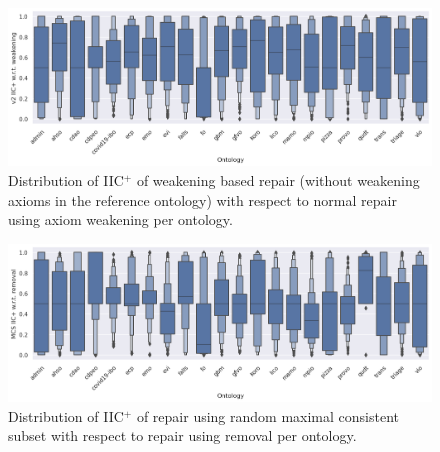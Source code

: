 \begin{figure}[htbp]
  \centering
  \includegraphics[width=\textwidth]{resources/eiic-enhance-weaken-ontology-violin.png}
  \caption{Distribution of IIC$^+$ of weakening based repair (without weakening axioms in the reference ontology) with respect to normal repair using axiom weakening per ontology.}
\end{figure}

\begin{figure}[htbp]
  \centering
  \includegraphics[width=\textwidth]{resources/eiic-mcs-rem-ontology-violin.png}
  \caption{Distribution of IIC$^+$ of repair using random maximal consistent subset with respect to repair using removal per ontology.}
\end{figure}

